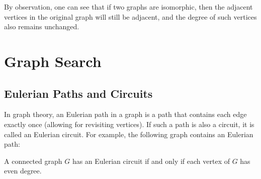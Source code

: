 By observation, one can see that if two graphs are isomorphic, then the adjacent vertices in the original graph will still be adjacent, and the degree of such vertices also remains unchanged.

\section{Graph Search}
\subsection{Eulerian Paths and Circuits}
In graph theory, an Eulerian path in a graph is a path that contains each edge exactly once (allowing for revisiting vertices). If such a path is also a circuit, it is called an Eulerian circuit. For example, the following graph contains an Eulerian path:
\begin{figure}[H]
  \centering
\end{figure}
\begin{remark}
  A connected graph \(G\) has an Eulerian circuit if and only if each vertex of \(G\) has even degree.
\end{remark}

